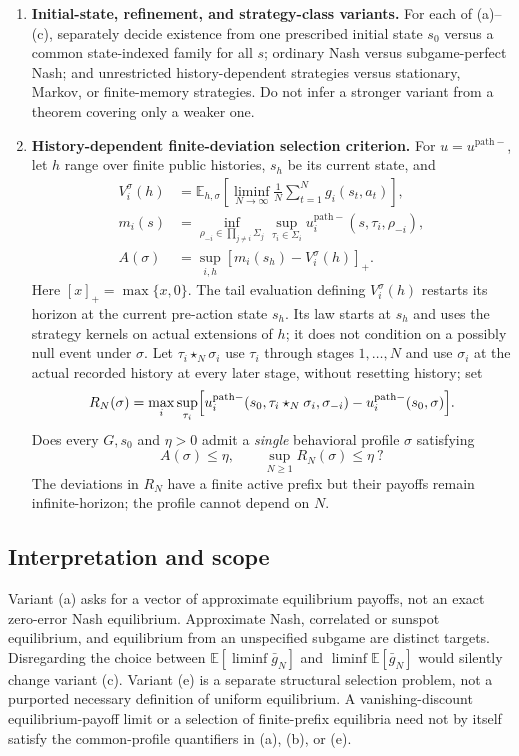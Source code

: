\documentclass[11pt,a4paper]{article}
\newcommand{\E}{\mathbb E}
\begin{document}
\begin{enumerate}[label=\textbf{(\alph*)},leftmargin=2.5em]
	\item \textbf{Initial-state, refinement, and strategy-class variants.}
	For each of (a)--(c), separately decide existence from one prescribed
	initial state $s_0$ versus a common state-indexed family for all $s$;
	ordinary Nash versus subgame-perfect Nash; and unrestricted
	history-dependent strategies versus stationary, Markov, or finite-memory
	strategies. Do not infer a stronger variant from a theorem covering only
	a weaker one.
	
	\item \textbf{History-dependent finite-deviation selection criterion.}
	For $u=u^{\mathrm{path}-}$, let $h$ range over finite public histories,
	$s_h$ be its current state, and
	\[
	\begin{aligned}
		V_i^\sigma(h)&=\E_{h,\sigma}
		\left[\liminf_{N\to\infty}\frac1N\sum_{t=1}^{N}g_i(s_t,a_t)\right],\\
		m_i(s)&=\inf_{\rho_{-i}\in\prod_{j\ne i}\Sigma_j}
        \sup_{\tau_i\in\Sigma_i}
		u_i^{\mathrm{path}-}(s,\tau_i,\rho_{-i}),\\
		A(\sigma)&=\sup_{i,h}[m_i(s_h)-V_i^\sigma(h)]_+.
	\end{aligned}
	\]
	Here $[x]_+=\max\{x,0\}$. The tail evaluation defining
$V_i^\sigma(h)$ restarts its horizon at the current pre-action state
$s_h$. Its law starts at $s_h$ and uses the strategy kernels on
actual extensions of $h$; it does not condition on a possibly null
event under $\sigma$. Let $\tau_i\star_N\sigma_i$ use $\tau_i$
through stages $1,\ldots,N$ and use $\sigma_i$ at the actual
recorded history at every later stage, without resetting history;
set
	\[
	R_N(\sigma)=\max_i\sup_{\tau_i}
	\Bigl[u_i^{\mathrm{path}-}(s_0,
	\tau_i\star_N\sigma_i,\sigma_{-i})
	-u_i^{\mathrm{path}-}(s_0,\sigma)\Bigr].
	\]
	Does every $G,s_0$ and $\eta>0$ admit a \emph{single} behavioral
	profile $\sigma$ satisfying
	\[
	\boxed{\quad A(\sigma)\le\eta,\qquad
		\sup_{N\ge1}R_N(\sigma)\le\eta\ ?\quad}
	\]
	The deviations in $R_N$ have a finite active prefix but their payoffs
	remain infinite-horizon; the profile cannot depend on $N$.
\end{enumerate}

\subsection*{Interpretation and scope}

Variant (a) asks for a vector of approximate equilibrium payoffs, not
an exact zero-error Nash equilibrium. Approximate Nash, correlated or
sunspot equilibrium, and equilibrium from an unspecified subgame are
distinct targets. Disregarding the choice between
$\E[\liminf\bar g_N]$ and $\liminf\E[\bar g_N]$ would silently change
variant (c). Variant (e) is a separate structural selection problem,
not a purported necessary definition of uniform equilibrium. A
vanishing-discount equilibrium-payoff limit or a selection of
finite-prefix equilibria need not by itself satisfy the common-profile
quantifiers in (a), (b), or (e).
\end{document}
